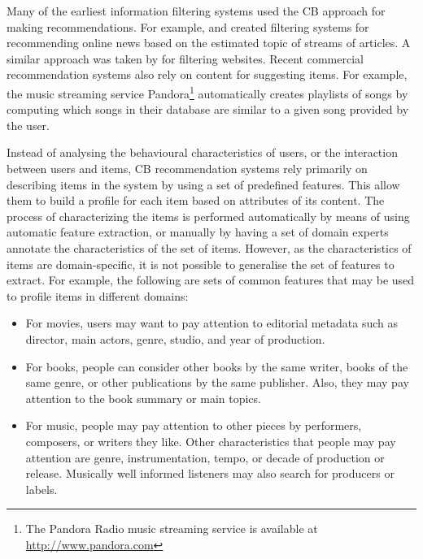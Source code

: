 Many of the earliest information filtering systems used the CB approach for making recommendations. For example, \textcite{fischer91information} and \textcite{sheth94learning} created filtering systems for recommending online news based on the estimated topic of streams of articles. A similar approach was taken by \textcite{pazzani96syskill} for filtering websites. 
Recent commercial recommendation systems also rely on content for suggesting items. For example, the music streaming service Pandora\footnote{The Pandora Radio music streaming service is available at  \url{http://www.pandora.com}} automatically creates  playlists of songs by computing which songs in their database are similar to a given song provided by the user.


Instead of analysing the behavioural characteristics of users, or the interaction between users and items, CB recommendation systems rely primarily on describing items in the system by using a set of predefined features. This allow them to build a profile for each item based on attributes of its content. 
The process of characterizing the items is performed automatically by means of using automatic feature extraction, or manually by having a set of domain experts annotate the characteristics of the set of items. 
However, as the characteristics of items are domain-specific, it is not possible to generalise the set of features to extract. 
For example, the following are sets of common features that may be used to profile items in different domains:


\begin{itemize}
\item For movies, users may want to pay attention to editorial metadata such as director, main actors, genre, studio, and year of production. 
\item For books, people can consider other books by the same writer,  books of the same genre, or other publications by the same publisher. Also, they may pay attention to the book summary or main topics. 
\item For music, people may pay attention to other pieces by performers, composers, or  writers they like. Other characteristics that people may pay attention are genre, instrumentation, tempo, or decade of production or release. Musically well informed listeners may also search for producers or labels.
\end{itemize}

